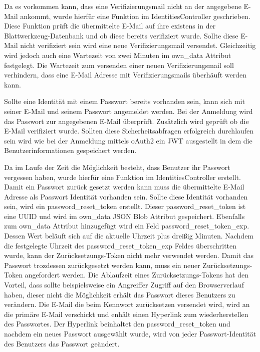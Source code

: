 \documentclass[paper=a4,fontsize=12pt,parskip=half]{scrartcl}
\begin{document}
\begin{description}
		Da es vorkommen kann, dass eine Verifizierungsmail nicht an der angegebene E-Mail ankommt, wurde hierfür eine Funktion im IdentitiesController geschrieben. Diese Funktion prüft die übermittelte E-Mail auf ihre existens in der Blattwerkzeug-Datenbank und ob diese bereits verifiziert wurde. Sollte diese E-Mail nicht verifiziert sein wird eine neue Verifizierungsmail versendet. Gleichzeitig wird jedoch auch eine Wartezeit von zwei Minuten im own\_data Attribut festgelegt. Die Wartezeit zum versenden einer neuen Verifizierungsmail soll verhindern, dass eine E-Mail Adresse mit Verifizierungsmails überhäuft werden kann.

		Sollte eine Identität mit einem Passwort bereits vorhanden sein, kann sich mit seiner E-Mail und seinem Passwort angemeldet werden. Bei der Anmeldung wird das Passwort zur angegebenen E-Mail überprüft. Zusätzlich wird geprüft ob die E-Mail verifiziert wurde. Sollten diese Sicherheitsabfragen erfolgreich durchlaufen sein wird wie bei der Anmeldung mittels \gls{oAuth2} ein \gls{JWT} ausgestellt in dem die Benutzerinformationen gespeichert werden.

		Da im Laufe der Zeit die Möglichkeit besteht, dass Benutzer ihr Passwort vergessen haben, wurde hierfür eine Funktion im IdentitiesController erstellt. Damit ein Passwort zurück gesetzt werden kann muss die übermittelte E-Mail Adresse als Passwort Identität vorhanden sein. Sollte diese Identität vorhanden sein, wird ein password\_reset\_token erstellt. Dieser password\_reset\_token ist eine \gls{UUID} und wird im own\_data JSON Blob Attribut gespeichert. Ebenfalls zum own\_data Attribut hinzugefügt wird ein Feld password\_reset\_token\_exp. Dessen Wert beläuft sich auf die aktuelle Uhrzeit plus dreißig Minuten. Nachdem die festgelegte Uhrzeit des password\_reset\_token\_exp Feldes überschritten wurde, kann der Zurücksetzungs-Token nicht mehr verwendet werden. Damit das Passwort trozdessen zurückgesetzt werden kann, muss ein neuer Zurücksetzungs-Token angefordert werden. Die Ablaufzeit eines Zurücksetzungs-Tokens hat den Vorteil, dass sollte beispielsweise ein Angreiffer Zugriff auf den Browserverlauf haben, dieser nicht die Möglichkeit erhält das Passwort dieses Benutzers zu verändern. Die E-Mail die beim Kennwort zurücksetzen versendet wird, wird an die primäre E-Mail verschickt und enhält einen Hyperlink zum wiederherstellen des Passwortes. Der Hyperlink beinhaltet den password\_reset\_token und nachdem ein neues Passwort ausgewählt wurde, wird von jeder Passwort-Identität des Benutzers das Passwort geändert.
	\end{description}
\end{document}
